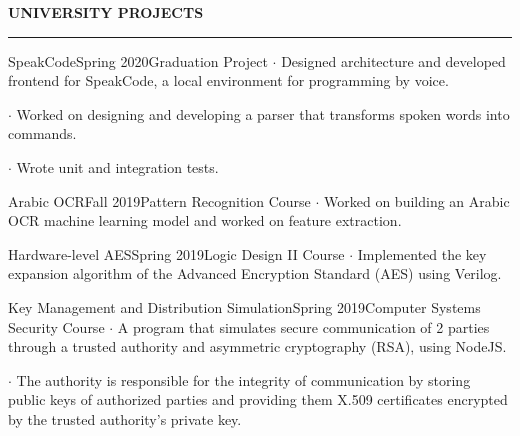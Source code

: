 \noindent\textcolor{themecolor}{\textbf{UNIVERSITY PROJECTS}}

\vspace{2mm}
\hrule
\vspace{3mm}

\begin{verbose}{SpeakCode}{Spring 2020}{Graduation Project}
    \noindent $\cdot$ Designed architecture and developed frontend for SpeakCode, a local environment for programming by voice.

    \noindent $\cdot$ Worked on designing and developing a parser that transforms spoken words into commands.

    \noindent $\cdot$ Wrote unit and integration tests.
\end{verbose}

\vspace{3mm}

\begin{verbose}{Arabic OCR}{Fall 2019}{Pattern Recognition Course}
    \noindent $\cdot$ Worked on building an Arabic OCR machine learning model and worked on feature extraction.
\end{verbose}

\vspace{3mm}

\begin{verbose}{Hardware-level AES}{Spring 2019}{Logic Design II Course}
    \noindent $\cdot$ Implemented the key expansion algorithm of the Advanced Encryption Standard (AES) using Verilog.
\end{verbose}

\vspace{3mm}

\begin{verbose}{Key Management and Distribution Simulation}{Spring 2019}{Computer Systems Security Course}
    \noindent $\cdot$ A program that simulates secure communication of 2 parties through a trusted authority and asymmetric cryptography (RSA), using NodeJS.

    \noindent $\cdot$ The authority is responsible for the integrity of communication by storing public keys of authorized parties and providing them X.509 certificates encrypted by the trusted authority's private key.
\end{verbose}

\vspace{3mm}

